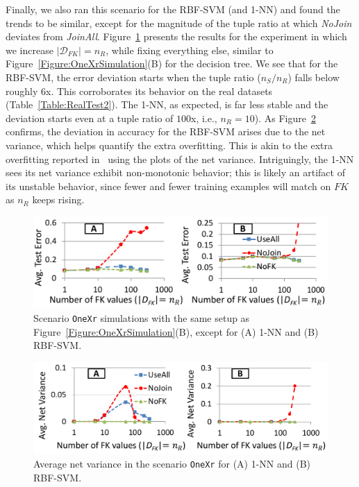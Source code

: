 \documentclass{vldb}
\begin{document}
Finally, we also ran this scenario for the RBF-SVM (and 1-NN) and found the trends to be similar, except for the magnitude of the tuple ratio at which 
\textit{NoJoin} deviates from \textit{JoinAll}. Figure~\ref{Figure:OneXr1nnSVMSimulation} presents the results for the experiment in which we increase $|\mathcal{D}_{FK}|=n_R$, 
while fixing everything else, similar to Figure~\ref{Figure:OneXrSimulation}(B) for the decision tree. We see that for the RBF-SVM, the error deviation starts when the 
tuple ratio ($n_S/n_R$) falls below roughly $6$x. This corroborates its behavior on the real datasets (Table~\ref{Table:RealTest2}).
The 1-NN, as expected, is far less stable and the deviation starts even at a tuple ratio of $100$x, i.e., $n_R = 10$).
As Figure~\ref{Figure:OneXr1nnSVMSimulationVariance} confirms, the deviation in accuracy for the RBF-SVM arises due to the net variance, 
which helps quantify the extra overfitting. This is akin to the extra overfitting reported in~\cite{hamlet} using the plots of the net variance.
Intriguingly, the 1-NN sees its net variance exhibit non-monotonic behavior; this is likely an artifact of its unstable behavior, since fewer and fewer
training examples will match on $FK$ as $n_R$ keeps rising.

\begin{figure}[t]
\centering
\includegraphics[width=0.99\linewidth]{onexr_svm_1nn.pdf}
\caption{Scenario \texttt{OneXr} simulations with the same setup as Figure~\ref{Figure:OneXrSimulation}(B), except for (A) 1-NN and (B) RBF-SVM.}
\label{Figure:OneXr1nnSVMSimulation}
\end{figure}

\begin{figure}[t]
\centering
\includegraphics[width=0.99\linewidth]{variance.pdf}
\caption{Average net variance in the scenario \texttt{OneXr} for (A) 1-NN and (B) RBF-SVM.}
\label{Figure:OneXr1nnSVMSimulationVariance}
\end{figure}
\end{document}
